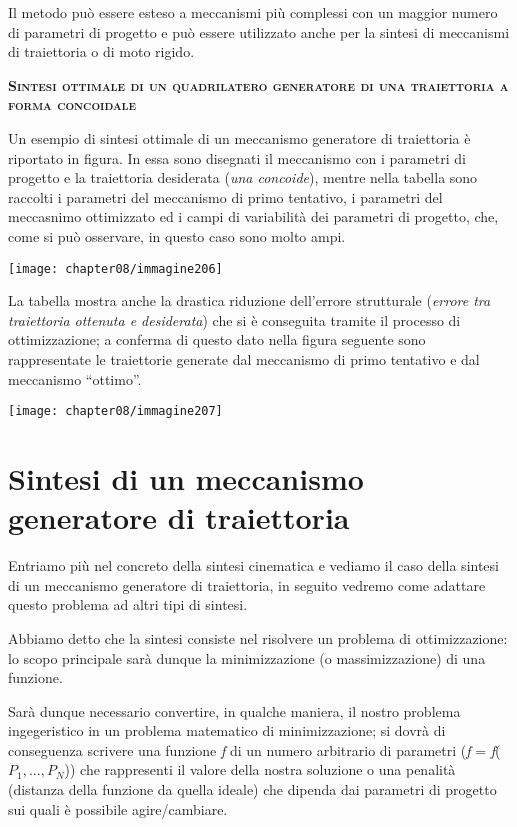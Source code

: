 Il metodo può essere esteso a meccanismi più complessi con un maggior numero di parametri di progetto e può essere utilizzato anche per la sintesi di meccanismi di traiettoria o di moto rigido.

\begin{center}
{\scshape{\bfseries Sintesi ottimale di un quadrilatero generatore di una traiettoria a forma concoidale}}
\end{center}

Un esempio di sintesi ottimale di un meccanismo generatore di traiettoria è riportato in figura. In essa sono disegnati il meccanismo con i parametri di progetto e la traiettoria desiderata (\emph{una concoide}), mentre nella tabella sono raccolti i parametri del meccanismo di primo tentativo, i parametri del meccasnimo ottimizzato ed i campi di variabilità dei parametri di progetto, che, come si può osservare, in questo caso sono molto ampi.
\begin{center}
\texttt{[image: chapter08/immagine206]}
\end{center}

La tabella mostra anche la drastica riduzione dell'errore strutturale (\emph{errore tra traiettoria ottenuta e desiderata}) che si è conseguita tramite il processo di ottimizzazione; a conferma di questo dato nella figura seguente sono rappresentate le traiettorie generate dal meccanismo di primo tentativo e dal meccanismo ``ottimo''.
\begin{center}
\texttt{[image: chapter08/immagine207]}
\end{center}

\section{Sintesi di un meccanismo generatore di traiettoria}

Entriamo più nel concreto della sintesi cinematica e vediamo il caso della sintesi di un meccanismo generatore di traiettoria, in seguito vedremo come adattare questo problema ad altri tipi di sintesi.

Abbiamo detto che la sintesi consiste nel risolvere un problema di ottimizzazione: lo scopo principale sarà dunque la minimizzazione (o massimizzazione) di una funzione.

Sarà dunque necessario convertire, in qualche maniera, il nostro problema ingegeristico in un problema matematico di minimizzazione; si dovrà di conseguenza scrivere una funzione \emph{f} di un numero arbitrario di parametri (\emph{f} = \emph{f}($P_1, \dots, P_N$)) che rappresenti il valore della nostra soluzione o una penalità (distanza della funzione da quella ideale) che dipenda dai parametri di progetto sui quali è possibile agire/cambiare.

